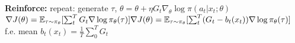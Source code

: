 \textbf{Reinforce:} repeat: generate $\tau$, $\theta = \theta + \eta G_t \nabla_\theta \log \pi(a_t|x_t; \theta)$\\
$\nabla J(\theta) = \mathbb{E}_{\tau \sim \pi_\theta}[\sum_t^T G_t \nabla \log \pi_\theta(\tau)]\\
\nabla J(\theta) = \mathbb{E}_{\tau \sim \pi_\theta}[\sum_t^T (G_t - b_t(x_t))\nabla \log \pi_\theta(\tau)]$\\
f.e. mean $b_t(x_t) = \frac{1}{T} \sum_0^T G_t$\\





















